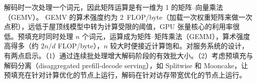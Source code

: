 \begin{interview}
解码时一次处理一个词元，因此矩阵运算是有一维为 1 的矩阵–向量乘法（GEMV）。
GEMV 的算术强度约为 2~FLOP/byte（加载一次权重矩阵来做一次点积），远低于屋顶线模型中转为计算受限的阈值，GPU 张量核心的利用率很低。预填充时同时处理 $n$ 个词元，运算成为矩阵–矩阵乘法（GEMM），算术强度高得多（约 $2n/d$ FLOP/byte），$n$ 较大时便接近计算饱和。对服务系统的设计，有两点启示。（1）通过连续批处理增大解码阶段的有效批大小。（2）考虑预填充与解码分离（disaggregated prefill-decode serving），如 Splitwise 和 Mooncake，让预填充在针对计算优化的节点上运行，解码在针对访存带宽优化的节点上运行。

\end{interview}
